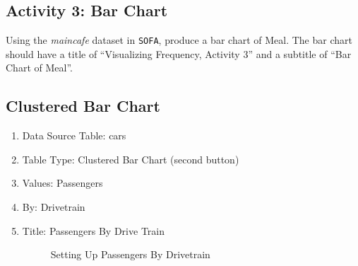 \subsection{Activity 3: Bar Chart} \label{vfr:act03}

Using the \textit{maincafe} dataset in \texttt{SOFA}, produce a bar chart of Meal. The bar chart should have a title of ``Visualizing Frequency, Activity 3'' and a subtitle of ``Bar Chart of Meal''.

\subsection{Clustered Bar Chart}

\begin{enumerate}
  \item Data Source Table: cars
  \item Table Type: Clustered Bar Chart (second button)
  \item Values: Passengers 
  \item By: Drivetrain
  \item Title: Passengers By Drive Train
  
  \begin{figure}[H]
    \begin{center}
      \caption{Setting Up Passengers By Drivetrain}
    \end{center}
  \end{figure}
  

\end{enumerate}
